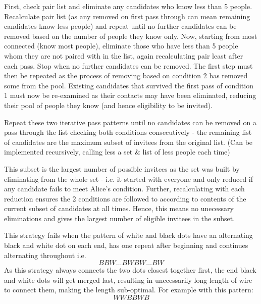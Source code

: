 \documentclass[11pt, a4paper]{article}
\begin{document}
{{{First, check pair list and eliminate any candidates who know less than 5 people.
Recalculate pair list (as any removed on first pass through can mean remaining candidates know less people) and repeat until no further candidates can be removed based on the number of people they know only.
Now, starting from most connected (know most people), eliminate those who have less than 5 people whom they are not paired with in the list, again recalculating pair least after each pass. Stop when no further candidates can be removed.
The first step must then be repeated as the process of removing based on condition 2 has removed some from the pool. Existing candidates that survived the first pass of condition 1 must now be re-examined as their contacts may have been eliminated, reducing their pool of people they know (and hence eligibility to be invited).

Repeat these two iterative pass patterns until no candidates can be removed on a pass through the list checking both conditions consecutively - the remaining list of candidates are the maximum subset of invitees from the original list. 
(Can be implemented recursively, calling less a set \& list of less people each time)

This subset is the largest number of possible invitees as the set was built by eliminating from the whole set - i.e. it started with everyone and only reduced if any candidate fails to meet Alice's condition. Further, recalculating with each reduction ensures the 2 conditions are followed to according to contents of the current subset of candidates at all times. Hence, this means no unecessary eliminations and gives the largest number of eligible invitees in the subset.

\vspace{10mm}


This strategy fails when the pattern of white and black dots have an alternating black and white dot on each end, has one repeat after beginning and continues alternating throughout i.e.
\[BBW  \dots  BWBW  \dots  BW \]
As this strategy always connects the two dots closest together first, the end black and white dots will get merged last, resulting in unecessarily long length of wire to connect them, making the length sub-optimal. For example with this pattern:
\[WWBBWB\]

}}}
\end{document}
